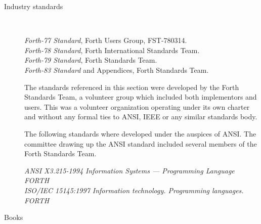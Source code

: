 
\label{annex:bib}

\begin{description}

\item[Industry standards]~

	\emph{Forth-77 Standard}, Forth Users Group, FST-780314. \\
	\emph{Forth-78 Standard}, Forth International Standards Team. \\
	\emph{Forth-79 Standard}, Forth Standards Team. \\
	\emph{Forth-83 Standard} and Appendices, Forth Standards Team.

	The standards referenced in this section were developed by the
	Forth Standards Team, a volunteer group which included both
	implementors and users. This was a volunteer organization operating
	under its own charter and without any formal ties to ANSI, IEEE or
	any similar standards body.

	The following standards where developed under the auspices of
    ANSI.  The committee drawing up the ANSI standard included
    several members of the Forth Standards Team.

	\emph{ANSI X3.215-1994 Information Systems --- Programming Language FORTH} \\
    \emph{ISO/IEC 15145:1997 Information technology.  Programming languages.  FORTH} \\


\item[Books]~

\end{description}
